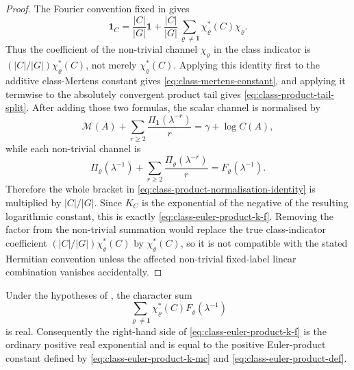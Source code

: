 \begin{proof}
  The Fourier convention fixed in  gives
  \[
    \mathbf1_C
    =
    \frac{|C|}{|G|}\mathbf1
    +
    \frac{|C|}{|G|}
      \sum_{\varrho\neq\mathbf1}\chi_\varrho^\ast(C)\chi_\varrho .
  \]
  Thus the coefficient of the non-trivial channel \(\chi_\varrho\) in the
  class indicator is \((|C|/|G|)\chi_\varrho^\ast(C)\), not merely
  \(
    \chi_\varrho^\ast(C)
  \).  Applying this identity first to the additive class-Mertens constant
  gives \eqref{eq:class-mertens-constant}, and applying it termwise to the
  absolutely convergent product tail gives
  \eqref{eq:class-product-tail-split}.  After adding those two formulas,
  the scalar channel is normalised by
  \[
    \mathcal M(A)+\sum_{r\ge2}\frac{\Pi_{\mathbf1}(\lambda^{-r})}{r}
    =\gamma+
    \log C(A),
  \]
  while each non-trivial channel is
  \[
    \Pi_\varrho(\lambda^{-1})
    +
    \sum_{r\ge2}\frac{\Pi_\varrho(\lambda^{-r})}{r}
    =F_\varrho(\lambda^{-1}).
  \]
  Therefore the whole bracket in
  \eqref{eq:class-product-normalisation-identity} is multiplied by
  \(|C|/|G|\).  Since \(K_C\) is the exponential of the negative of the
  resulting logarithmic constant, this is exactly
  \eqref{eq:class-euler-product-k-f}.  Removing the factor from the
  non-trivial summation would replace the true class-indicator coefficient
  \((|C|/|G|)\chi_\varrho^\ast(C)\) by
  \(\chi_\varrho^\ast(C)\), so it is not compatible with the stated
  Hermitian convention unless the affected non-trivial fixed-label linear
  combination vanishes accidentally.
\end{proof}

\begin{lemma}
  \label{lem:class-product-positive-real-branch}
  \label{lem:class-euler-product-real-branch}
  Under the hypotheses of , the
  character sum
  \begin{equation}\label{eq:class-euler-product-character-exponent}
    \sum_{\varrho\neq\mathbf1}
      \chi_\varrho^\ast(C)F_\varrho(\lambda^{-1})
  \end{equation}
  is real. Consequently the right-hand side of
  \eqref{eq:class-euler-product-k-f} is the ordinary positive real
  exponential and is equal to the positive Euler-product constant defined
  by \eqref{eq:class-euler-product-k-mc} and
  \eqref{eq:class-euler-product-def}.
\end{lemma}

